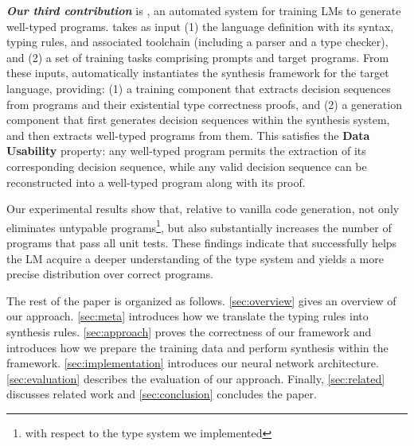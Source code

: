 \textbf{\textit{Our third contribution}} is \mainname, an automated system for training LMs to generate well-typed programs. \mainname takes as input (1) the language definition with its syntax, typing rules, and associated toolchain (including a parser and a type checker), and (2) a set of training tasks comprising prompts and target programs. 
From these inputs, \mainname automatically instantiates the synthesis framework for the target language, providing: (1) a training component that extracts decision sequences from programs and their existential type correctness proofs, and (2) a generation component that first generates decision sequences within the synthesis system, and then extracts well-typed programs from them.
This satisfies the \textbf{Data Usability} property: any well-typed program permits the extraction of its corresponding decision sequence, while any valid decision sequence can be reconstructed into a well-typed program along with its proof.

\smallskip
Our experimental results show that, relative to vanilla code generation, \mainname not only eliminates untypable programs\footnote{with respect to the type system we implemented}, but also substantially increases the number of programs that pass all unit tests. These findings indicate that \mainname successfully helps the LM acquire a deeper understanding of the type system and yields a more precise distribution over correct programs.

The rest of the paper is organized as follows. 
\autoref{sec:overview} gives an overview of our approach. 
\autoref{sec:meta} introduces how we translate the typing rules into synthesis rules. 
\autoref{sec:approach} proves the correctness of our framework and introduces how we prepare the training data and perform synthesis within the framework. 
\autoref{sec:implementation} introduces our neural network architecture. 
\autoref{sec:evaluation} describes the evaluation of our approach. 
Finally, \autoref{sec:related} discusses related work and \autoref{sec:conclusion} concludes the paper.
